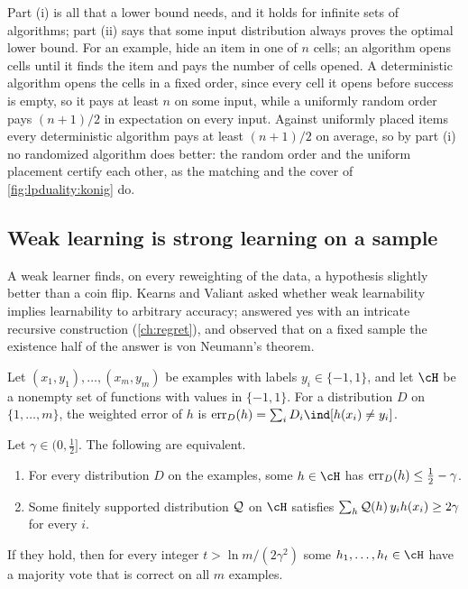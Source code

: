 \begin{refsection}
Part (i) is all that a lower bound needs, and it holds for infinite sets of algorithms; part (ii) says that some input distribution always proves the optimal lower bound. For an example, hide an item in one of $n$ cells; an algorithm opens cells until it finds the item and pays the number of cells opened. A deterministic algorithm opens the cells in a fixed order, since every cell it opens before success is empty, so it pays at least $n$ on some input, while a uniformly random order pays $(n+1)/2$ in expectation on every input. Against uniformly placed items every deterministic algorithm pays at least $(n+1)/2$ on average, so by part (i) no randomized algorithm does better: the random order and the uniform placement certify each other, as the matching and the cover of \cref{fig:lpduality:konig} do.

\subsection{Weak learning is strong learning on a sample}

A weak learner finds, on every reweighting of the data, a hypothesis slightly better than a coin flip. Kearns and Valiant asked whether weak learnability implies learnability to arbitrary accuracy; \textcite{Schapire1990} answered yes with an intricate recursive construction (\cref{ch:regret}), and \textcite{FreundSchapire1996} observed that on a fixed sample the existence half of the answer is von Neumann's theorem.

Let $(x_1,y_1),\dots,(x_m,y_m)$ be examples with labels $y_i\in\{-1,1\}$, and let $\cH$ be a nonempty set of functions with values in $\{-1,1\}$. For a distribution $D$ on $\{1,\dots,m\}$, the weighted error of $h$ is $\lperr_D(h)=\sum_iD_i\ind[h(x_i)\ne y_i]$.

\begin{theorem}\label{thm:lpduality:boosting}
Let $\gamma\in(0,\frac12]$. The following are equivalent.
\begin{enumerate}
\item For every distribution $D$ on the examples, some $h\in\cH$ has $\operatorname{err}_D(h)\le\frac12-\gamma$.
\item Some finitely supported distribution $\mathcal{Q}$ on $\cH$ satisfies $\sum_h\mathcal{Q}(h)\,y_ih(x_i)\ge2\gamma$ for every $i$.
\end{enumerate}
If they hold, then for every integer $t>\ln m/(2\gamma^2)$ some $h_1,\dots,h_t\in\cH$ have a majority vote that is correct on all $m$ examples.
\end{theorem}


\end{refsection}
